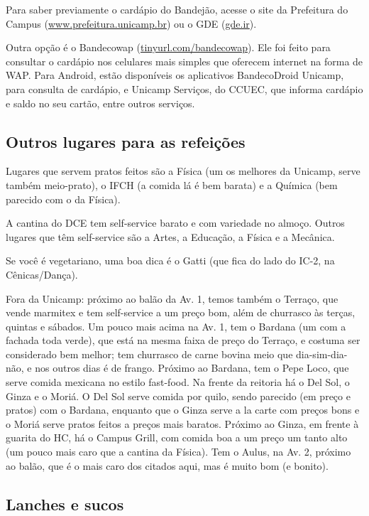 Para saber previamente o cardápio do Bandejão, acesse o site da Prefeitura do Campus (\url{www.prefeitura.unicamp.br}) ou o
GDE (\url{gde.ir}).

Outra opção é o Bandecowap (\url{tinyurl.com/bandecowap}). Ele foi feito
para consultar o cardápio nos celulares mais simples que oferecem internet na forma
de WAP. Para Android, estão disponíveis os aplicativos BandecoDroid Unicamp,
para consulta de cardápio, e Unicamp Serviços, do CCUEC, que informa cardápio
e saldo no seu cartão, entre outros serviços.

\subsection{Outros lugares para as refeições}

Lugares que servem pratos feitos são a Física (um os melhores da Unicamp, serve
também meio-prato), o IFCH (a comida lá é bem barata) e a Química (bem parecido
com o da Física).

A cantina do DCE tem self-service barato e com variedade no almoço. Outros
lugares que têm self-service são a Artes, a Educação, a Física e a Mecânica.

Se você é vegetariano, uma boa dica é o Gatti (que fica do lado do IC-2, na
Cênicas/Dança).

Fora da Unicamp: próximo ao balão da Av. 1, temos também o Terraço, que vende
marmitex e tem self-service a um preço bom, além de churrasco às terças, quintas
e sábados. Um pouco mais acima na Av. 1, tem o Bardana (um com a fachada toda
verde), que está na mesma faixa de preço do Terraço, e costuma ser considerado
bem melhor; tem churrasco de carne bovina meio que dia-sim-dia-não, e nos outros
dias é de frango. Próximo ao Bardana, tem o Pepe Loco, que serve comida mexicana
no estilo fast-food. Na frente da reitoria há o Del Sol, o Ginza e o Moriá.
O Del Sol serve comida por quilo, sendo parecido (em preço e pratos) com
o Bardana, enquanto que o Ginza serve a la carte com preços bons e o Moriá serve pratos feitos a preços mais baratos. Próximo ao
Ginza, em frente à guarita do HC, há o Campus Grill, com comida boa a um preço
um tanto alto (um pouco mais caro que a cantina da Física). Tem o Aulus, na Av.
2, próximo ao balão, que é o mais caro dos citados aqui, mas é muito bom (e
bonito).

\subsection{Lanches e sucos}

